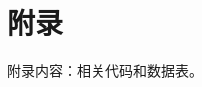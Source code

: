 \documentclass[a4paper]{article}
\begin{document}
\clearpage

\section*{附录}

附录内容：相关代码和数据表。
\end{document}
